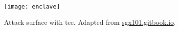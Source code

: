 \begin{figure}[!ht]
	\centering
	\texttt{[image: enclave]}
	\caption[Attack surface with \acrshort{tee}]{
		Attack surface with \acrshort{tee}.
		Adapted from \url{sgx101.gitbook.io}.
	}%
	\label{figure:enclave}
\end{figure}
